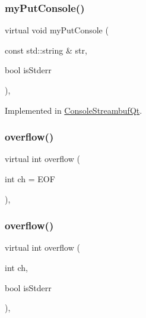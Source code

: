 \subsubsection{\texorpdfstring{my\+Put\+Console()}{myPutConsole()}}
{\footnotesize\ttfamily virtual void my\+Put\+Console (\begin{DoxyParamCaption}\item[{const std\+::string \&}]{str,  }\item[{bool}]{is\+Stderr }\end{DoxyParamCaption})\hspace{0.3cm}{\ttfamily [protected]}, {}}



Implemented in \mbox{\hyperlink{classstanfordcpplib_1_1qtgui_1_1ConsoleStreambufQt_aa8582bd55e3d7fc8860ca9c87efe3dea}{Console\+Streambuf\+Qt}}.

\mbox{\label{classstanfordcpplib_1_1ConsoleStreambuf_adccb3cd5475ba3c83bc2b0a8cbd731c0}} 
\subsubsection{\texorpdfstring{overflow()}{overflow()}\hspace{0.1cm}{\footnotesize\ttfamily [1/2]}}
{\footnotesize\ttfamily virtual int overflow (\begin{DoxyParamCaption}\item[{int}]{ch = {\ttfamily EOF} }\end{DoxyParamCaption})\hspace{0.3cm}{\ttfamily [inline]}, {\ttfamily [virtual]}}

\mbox{\label{classstanfordcpplib_1_1ConsoleStreambuf_a5cfed6bdc955e2129ced962625045f8e}} 
\subsubsection{\texorpdfstring{overflow()}{overflow()}\hspace{0.1cm}{\footnotesize\ttfamily [2/2]}}
{\footnotesize\ttfamily virtual int overflow (\begin{DoxyParamCaption}\item[{int}]{ch,  }\item[{bool}]{is\+Stderr }\end{DoxyParamCaption})\hspace{0.3cm}{\ttfamily [inline]}, {\ttfamily [virtual]}}

